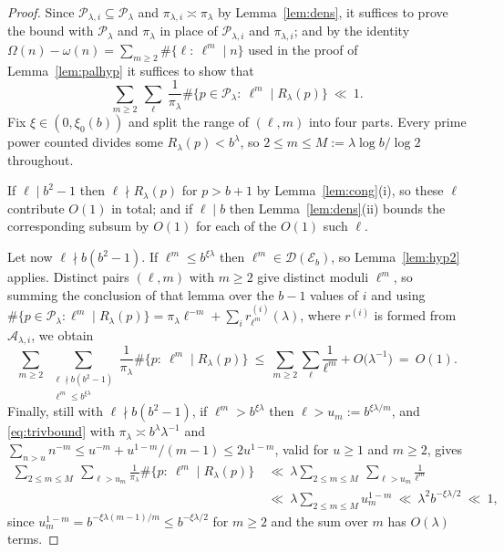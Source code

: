 \documentclass[11pt,a4paper]{article}
\theoremstyle{plain}
\theoremstyle{definition}
\numberwithin{equation}{section}
\begin{document}
\begin{proof}
Since $\mathcal P_{\lambda,i}\subseteq\mathcal P_\lambda$ and $\pi_{\lambda,i}\asymp\pi_\lambda$ by
Lemma~\ref{lem:dens}, it suffices to prove the bound with $\mathcal P_\lambda$ and $\pi_\lambda$ in place
of $\mathcal P_{\lambda,i}$ and $\pi_{\lambda,i}$; and by the identity
$\Omega(n)-\omega(n)=\sum_{m\ge2}\#\{\ell:\ \ell^{m}\mid n\}$ used in the proof of
Lemma~\ref{lem:palhyp} it suffices to show that
\[
\sum_{m\ge2}\ \sum_{\ell}\ \frac{1}{\pi_\lambda}
\#\bigl\{p\in\mathcal P_\lambda:\ \ell^{m}\mid R_\lambda(p)\bigr\}\ \ll\ 1 .
\]
Fix $\xi\in(0,\xi_0(b))$ and split the range of $(\ell,m)$ into four parts. Every prime power counted
divides some $R_\lambda(p)<b^{\lambda}$, so $2\le m\le M:=\lambda\log b/\log2$ throughout.

If $\ell\mid b^{2}-1$ then $\ell\nmid R_\lambda(p)$ for $p>b+1$ by Lemma~\ref{lem:cong}(i), so these
$\ell$ contribute $O(1)$ in total; and if $\ell\mid b$ then Lemma~\ref{lem:dens}(ii) bounds the
corresponding subsum by $O(1)$ for each of the $O(1)$ such $\ell$.

Let now $\ell\nmid b(b^{2}-1)$. If $\ell^{m}\le b^{\xi\lambda}$ then $\ell^{m}\in\mathcal D(\mathcal E_b)$,
so Lemma~\ref{lem:hyp2} applies. Distinct pairs $(\ell,m)$ with $m\ge2$ give distinct moduli $\ell^{m}$, so
summing the conclusion of that lemma over the $b-1$ values of $i$ and using
$\#\{p\in\mathcal P_\lambda:\ell^{m}\mid R_\lambda(p)\}=\pi_\lambda\ell^{-m}+\sum_{i}r^{(i)}_{\ell^{m}}(\lambda)$,
where $r^{(i)}$ is formed from $\mathcal A_{\lambda,i}$, we obtain
\[
\sum_{m\ge2}\ \sum_{\substack{\ell\nmid b(b^{2}-1)\\ \ell^{m}\le b^{\xi\lambda}}}
\frac{1}{\pi_\lambda}\#\bigl\{p:\ \ell^{m}\mid R_\lambda(p)\bigr\}
\ \le\ \sum_{m\ge2}\sum_{\ell}\frac{1}{\ell^{m}}+O\bigl(\lambda^{-1}\bigr)\ =\ O(1).
\]
Finally, still with $\ell\nmid b(b^{2}-1)$, if $\ell^{m}>b^{\xi\lambda}$ then
$\ell>u_m:=b^{\xi\lambda/m}$, and \eqref{eq:trivbound} with
$\pi_\lambda\asymp b^{\lambda}\lambda^{-1}$ and
$\sum_{n>u}n^{-m}\le u^{-m}+u^{1-m}/(m-1)\le2u^{1-m}$, valid for $u\ge1$ and $m\ge2$, gives
\[
\begin{aligned}
\sum_{2\le m\le M}\ \sum_{\ell>u_m}\frac{1}{\pi_\lambda}
\#\bigl\{p:\ \ell^{m}\mid R_\lambda(p)\bigr\}
&\ \ll\ \lambda\sum_{2\le m\le M}\ \sum_{\ell>u_m}\frac{1}{\ell^{m}} \\
&\ \ll\ \lambda\sum_{2\le m\le M}u_m^{1-m}\ \ll\
\lambda^{2}b^{-\xi\lambda/2}\ \ll\ 1,
\end{aligned}
\]
since $u_m^{1-m}=b^{-\xi\lambda(m-1)/m}\le b^{-\xi\lambda/2}$ for $m\ge2$ and the sum over $m$ has
$O(\lambda)$ terms.
\end{proof}
\end{document}
